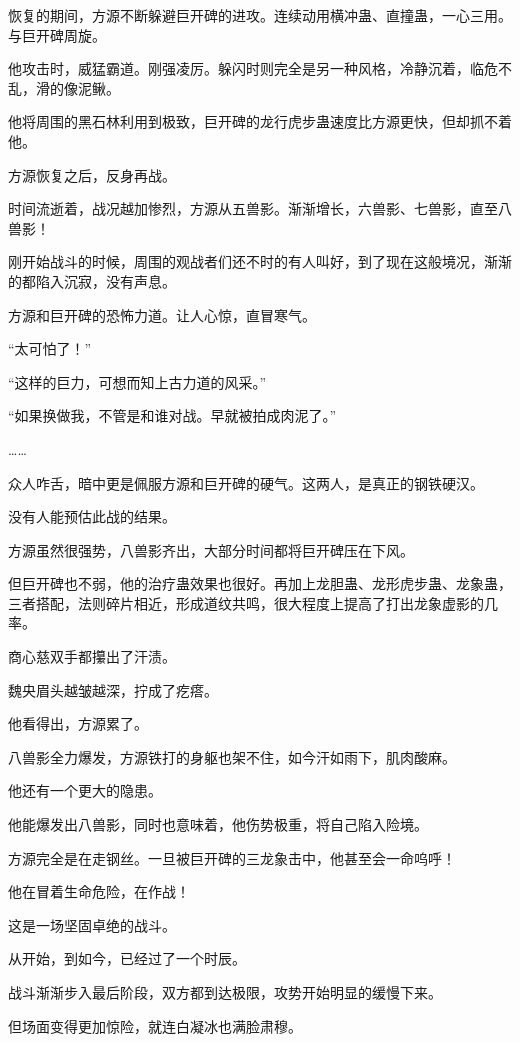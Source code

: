 \begin{this_body}
恢复的期间，方源不断躲避巨开碑的进攻。连续动用横冲蛊、直撞蛊，一心三用。与巨开碑周旋。

他攻击时，威猛霸道。刚强凌厉。躲闪时则完全是另一种风格，冷静沉着，临危不乱，滑的像泥鳅。

他将周围的黑石林利用到极致，巨开碑的龙行虎步蛊速度比方源更快，但却抓不着他。

方源恢复之后，反身再战。

时间流逝着，战况越加惨烈，方源从五兽影。渐渐增长，六兽影、七兽影，直至八兽影！

刚开始战斗的时候，周围的观战者们还不时的有人叫好，到了现在这般境况，渐渐的都陷入沉寂，没有声息。

方源和巨开碑的恐怖力道。让人心惊，直冒寒气。

“太可怕了！”

“这样的巨力，可想而知上古力道的风采。”

“如果换做我，不管是和谁对战。早就被拍成肉泥了。”

……

众人咋舌，暗中更是佩服方源和巨开碑的硬气。这两人，是真正的钢铁硬汉。

没有人能预估此战的结果。

方源虽然很强势，八兽影齐出，大部分时间都将巨开碑压在下风。

但巨开碑也不弱，他的治疗蛊效果也很好。再加上龙胆蛊、龙形虎步蛊、龙象蛊，三者搭配，法则碎片相近，形成道纹共鸣，很大程度上提高了打出龙象虚影的几率。

商心慈双手都攥出了汗渍。

魏央眉头越皱越深，拧成了疙瘩。

他看得出，方源累了。

八兽影全力爆发，方源铁打的身躯也架不住，如今汗如雨下，肌肉酸麻。

他还有一个更大的隐患。

他能爆发出八兽影，同时也意味着，他伤势极重，将自己陷入险境。

方源完全是在走钢丝。一旦被巨开碑的三龙象击中，他甚至会一命呜呼！

他在冒着生命危险，在作战！

这是一场坚固卓绝的战斗。

从开始，到如今，已经过了一个时辰。

战斗渐渐步入最后阶段，双方都到达极限，攻势开始明显的缓慢下来。

但场面变得更加惊险，就连白凝冰也满脸肃穆。


\end{this_body}
